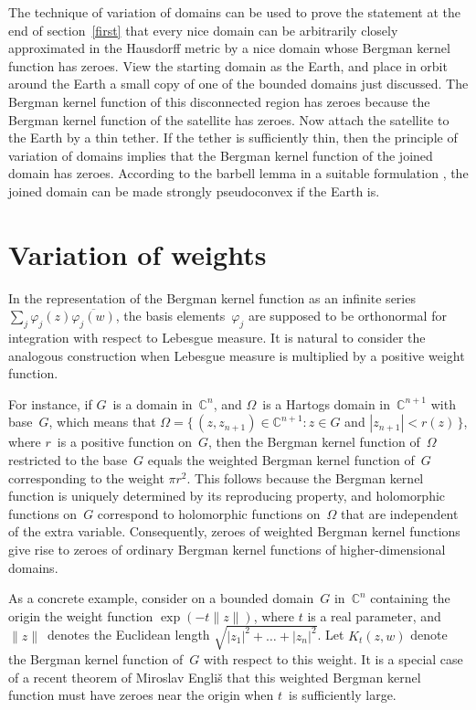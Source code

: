 \documentclass[12pt]{amsart}
\theoremstyle{definition}
\newcommand{\C}{\mathbb{C}}
\begin{document}
The technique of variation of domains can be used to prove the
statement at the end of section~\ref{first} that every nice
domain can be arbitrarily closely approximated in the Hausdorff
metric by a nice domain whose Bergman kernel function has zeroes.
View the starting domain as the Earth, and place in orbit around
the Earth a small copy of one of the bounded domains just
discussed. The Bergman kernel function of this disconnected
region has zeroes because the Bergman kernel function of the
satellite has zeroes. Now attach the satellite to the Earth by a
thin tether. If the tether is sufficiently thin, then the
principle of variation of domains implies that the Bergman kernel
function of the joined domain has zeroes. According to the
barbell lemma \cite[Chapter~5, Exercise~21]{Krantz} in a suitable
formulation \cite{boasgeneric}, the joined domain can be made
strongly pseudoconvex if the Earth is.

\section{Variation of weights}
In the representation of the Bergman kernel function as an
infinite series \(\sum_j \varphi_j(z)\overline{\varphi_j(w)}\),
the basis elements~\(\varphi_j\) are supposed to be orthonormal
for integration with respect to Lebesgue measure.  It is natural
to consider the analogous construction when Lebesgue measure is
multiplied by a positive weight function.

For instance, if \(G\)~is a domain in~\(\C^n\), and \(\Omega\)~is
a Hartogs domain in~\(\C^{n+1}\) with base~\(G\), which means
that \(\Omega = \{\,(z,z_{n+1})\in\C^{n+1}: z\in G\) and
\(|z_{n+1}|<r(z)\,\}\), where \(r\)~is a positive function
on~\(G\), then the Bergman kernel function of~\(\Omega\)
restricted to the base~\(G\) equals the weighted Bergman kernel
function of~\(G\) corresponding to the weight \(\pi r^2\). This
follows because the Bergman kernel function is uniquely
determined by its reproducing property, and holomorphic functions
on~\(G\) correspond to holomorphic functions on~\(\Omega\) that
are independent of the extra variable. Consequently, zeroes of
weighted Bergman kernel functions give rise to zeroes of ordinary
Bergman kernel functions of higher-dimensional domains.

As a concrete example, consider on a bounded domain~\(G\)
in~\(\C^n\) containing the origin the weight function
\(\exp(-t\|z\|)\), where \(t\) is a real parameter, and
\(\|z\|\)~denotes the Euclidean length
\(\sqrt{|z_1|^2+\dots+|z_n|^2}\).  Let \(K_t(z,w)\) denote the
Bergman kernel function of~\(G\) with respect to this weight. It
is a special case of a recent theorem of Miroslav Engli{\v{s}}
\cite{englis} that this weighted Bergman kernel function must
have zeroes near the origin when \(t\)~is sufficiently large.
\end{document}

